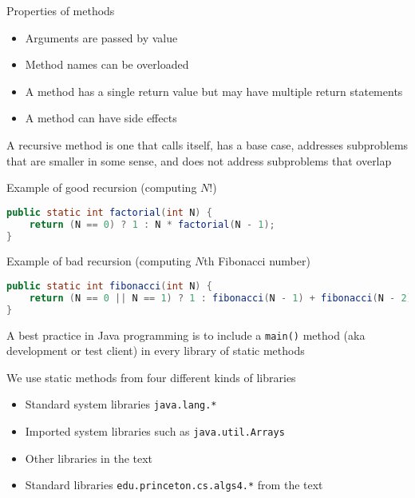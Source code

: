 \documentclass[8pt,a4paper,compress]{beamer}
\begin{document}
\begin{frame}[fragile]
\pause

Properties of methods
\begin{itemize}
\item Arguments are passed by value
\item Method names can be overloaded 
\item A method has a single return value but may have multiple return statements
\item A method can have side effects
\end{itemize}

\pause
\bigskip

A recursive method is one that calls itself, has a base case, addresses subproblems that are smaller in some sense, and does not address subproblems that overlap

\pause
\bigskip

Example of good recursion (computing $N!$)
\begin{lstlisting}[language=Java]
public static int factorial(int N) {
    return (N == 0) ? 1 : N * factorial(N - 1); 
}
\end{lstlisting}

\pause
\bigskip

Example of bad recursion (computing $N$th Fibonacci number)
\begin{lstlisting}[language=Java]
public static int fibonacci(int N) {
    return (N == 0 || N == 1) ? 1 : fibonacci(N - 1) + fibonacci(N - 2); 
}
\end{lstlisting}
\end{frame}

\begin{frame}[fragile]
\pause

A best practice in Java programming is to include a \lstinline{main()} method (aka development or test client) in every library of static methods

\pause
\bigskip

We use static methods from four different kinds of libraries
\begin{itemize}
\item Standard system libraries \lstinline{java.lang.*}
\item Imported system libraries such as \lstinline{java.util.Arrays}
\item Other libraries in the text
\item Standard libraries \lstinline{edu.princeton.cs.algs4.*} from the text
\end{itemize}
\end{frame}
\end{document}
